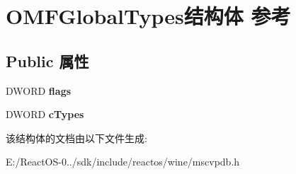 \hypertarget{struct_o_m_f_global_types}{}\section{O\+M\+F\+Global\+Types结构体 参考}
\label{struct_o_m_f_global_types}
\subsection*{Public 属性}
\begin{DoxyCompactItemize}
\item 
\mbox{\label{struct_o_m_f_global_types_a03a3ba4dd786d87674456ef8dcd5548b}} 
D\+W\+O\+RD {\bfseries flags}
\item 
\mbox{\label{struct_o_m_f_global_types_aa232e1fd5f54733bb3eadac8a4c2a1b8}} 
D\+W\+O\+RD {\bfseries c\+Types}
\end{DoxyCompactItemize}


该结构体的文档由以下文件生成\+:\begin{DoxyCompactItemize}
\item 
E\+:/\+React\+O\+S-\/0../sdk/include/reactos/wine/mscvpdb.\+h\end{DoxyCompactItemize}
